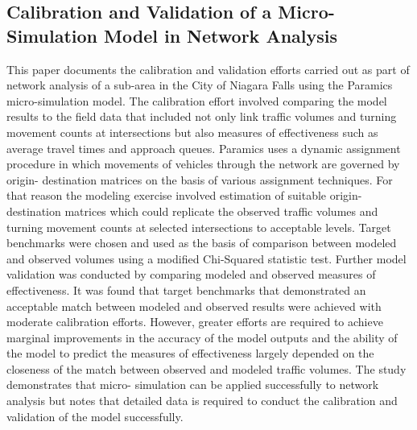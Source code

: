 \documentclass{article}
\begin{document}
\subsection* {Calibration and Validation of a Micro-Simulation Model in Network Analysis \cite{calibValid}}
This paper documents the calibration and validation efforts carried out as part of network analysis of a sub-area in the City of Niagara Falls using the Paramics micro-simulation model. The calibration effort involved comparing the model results to the field data that included not only link traffic volumes and turning movement counts at intersections but also measures of effectiveness such as average travel times and approach queues. Paramics uses a dynamic assignment procedure in which movements of vehicles through the network are governed by origin- destination matrices on the basis of various assignment techniques. For that reason the modeling exercise involved estimation of suitable origin-destination matrices which could replicate the observed traffic volumes and turning movement counts at selected intersections to acceptable levels. Target benchmarks were chosen and used as the basis of comparison between modeled and observed volumes using a modified Chi-Squared statistic test. Further model validation was conducted by comparing modeled and observed measures of effectiveness. It was found that target benchmarks that demonstrated an acceptable match between modeled and observed results were achieved with moderate calibration efforts. However, greater efforts are required to achieve marginal improvements in the accuracy of the model outputs and the ability of the model to predict the measures of effectiveness largely depended on the closeness of the match between observed and modeled traffic volumes. The study demonstrates that micro- simulation can be applied successfully to network analysis but notes that detailed data is required to conduct the calibration and validation of the model successfully. %
\end{document}
